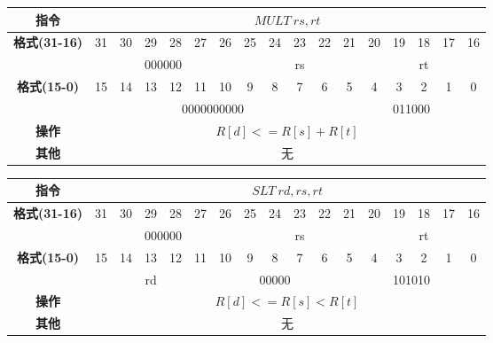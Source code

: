 \documentclass[11pt,utf8]{article}
\begin{document}
\begin{center}
\begin{tabular}{|c|c|c|c|c|c|c|c|c|c|c|c|c|c|c|c|c|}
\hline
\textbf{指令} & \multicolumn{16}{c|}{$MULT~rs,rt$} \\
\hline
\multirow{2}{*}{\textbf{格式(31-16)}} & 31 & 30 & 29 & 28 & 27 & 26 & 25 & 24 & 23 & 22 & 21 & 20 & 19 & 18 & 17 & 16 \\ 
\cline{2-17}
& \multicolumn{6}{c|}{000000} & \multicolumn{5}{c|}{rs} & \multicolumn{5}{c|}{rt}\\
\hline
\multirow{2}{*}{\textbf{格式(15-0)}} & 15 & 14 & 13 & 12 & 11 & 10 & 9 & 8 & 7 & 6 & 5 & 4 & 3 & 2 & 1 & 0 \\
\cline{2-17}
& \multicolumn{10}{c|}{0000000000} & \multicolumn{6}{c|}{011000}  \\
\hline
\textbf{操作} & \multicolumn{16}{c|}{$R[d]<=R[s]+R[t]$} \\
\hline
\textbf{其他} & \multicolumn{16}{c|}{无} \\
\hline
\end{tabular}
\end{center}

\begin{center}
\begin{tabular}{|c|c|c|c|c|c|c|c|c|c|c|c|c|c|c|c|c|}
\hline
\textbf{指令} & \multicolumn{16}{c|}{$SLT~rd,rs,rt$} \\
\hline
\multirow{2}{*}{\textbf{格式(31-16)}} & 31 & 30 & 29 & 28 & 27 & 26 & 25 & 24 & 23 & 22 & 21 & 20 & 19 & 18 & 17 & 16 \\ 
\cline{2-17}
& \multicolumn{6}{c|}{000000} & \multicolumn{5}{c|}{rs} & \multicolumn{5}{c|}{rt}\\
\hline
\multirow{2}{*}{\textbf{格式(15-0)}} & 15 & 14 & 13 & 12 & 11 & 10 & 9 & 8 & 7 & 6 & 5 & 4 & 3 & 2 & 1 & 0 \\
\cline{2-17}
& \multicolumn{5}{c|}{rd} & \multicolumn{5}{c|}{00000} & \multicolumn{6}{c|}{101010}  \\
\hline
\textbf{操作} & \multicolumn{16}{c|}{$R[d]<=R[s]<R[t]$} \\
\hline
\textbf{其他} & \multicolumn{16}{c|}{无} \\
\hline
\end{tabular}
\end{center}
\end{document}
